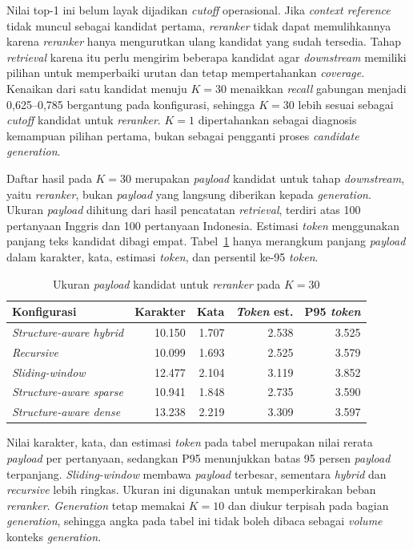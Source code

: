 Nilai top-1 ini belum layak dijadikan \emph{cutoff} operasional. Jika \emph{context reference} tidak muncul
sebagai kandidat pertama, \emph{reranker} tidak dapat memulihkannya karena \emph{reranker} hanya mengurutkan
ulang kandidat yang sudah tersedia. Tahap \emph{retrieval} karena itu perlu mengirim beberapa kandidat
agar \emph{downstream} memiliki pilihan untuk memperbaiki urutan dan tetap mempertahankan \emph{coverage}.
Kenaikan dari satu kandidat menuju \(K = 30\) menaikkan \emph{recall} gabungan menjadi 0,625--0,785
bergantung pada konfigurasi, sehingga \(K = 30\) lebih sesuai sebagai \emph{cutoff} kandidat untuk
\emph{reranker}. \(K = 1\) dipertahankan sebagai diagnosis kemampuan pilihan pertama, bukan sebagai
pengganti proses \emph{candidate} \emph{generation}.

Daftar hasil pada \(K = 30\) merupakan \emph{payload} kandidat untuk tahap \emph{downstream}, yaitu \emph{reranker},
bukan \emph{payload} yang langsung diberikan kepada \emph{generation}. Ukuran \emph{payload} dihitung dari hasil pencatatan
\emph{retrieval}, terdiri atas 100 pertanyaan Inggris dan 100 pertanyaan Indonesia. Estimasi \emph{token}
menggunakan panjang teks kandidat dibagi empat. Tabel~\ref{tab:customer-system-volume} hanya
merangkum panjang \emph{payload} dalam karakter, kata, estimasi \emph{token}, dan persentil ke-95 \emph{token}.

\begin{table}[H]
\centering
\scriptsize
\caption{Ukuran \emph{payload} kandidat untuk \emph{reranker} pada \(K = 30\)}
\label{tab:customer-system-volume}
\begin{tabularx}{\textwidth}{@{}>{\RaggedRight\arraybackslash}p{4.0cm}rrrr@{}}
\toprule
\textbf{Konfigurasi} & \textbf{Karakter} & \textbf{Kata} & \textbf{\emph{Token} est.} & \textbf{P95 \emph{token}}\\
\midrule
\emph{Structure-aware hybrid} & 10.150 & 1.707 & 2.538 & 3.525\\
\emph{Recursive} & 10.099 & 1.693 & 2.525 & 3.579\\
\emph{Sliding-window} & 12.477 & 2.104 & 3.119 & 3.852\\
\emph{Structure-aware sparse} & 10.941 & 1.848 & 2.735 & 3.590\\
\emph{Structure-aware dense} & 13.238 & 2.219 & 3.309 & 3.597\\
\bottomrule
\end{tabularx}
\end{table}

Nilai karakter, kata, dan estimasi \emph{token} pada tabel merupakan nilai rerata \emph{payload} per pertanyaan,
sedangkan P95 menunjukkan batas 95 persen \emph{payload} terpanjang. \emph{Sliding-window} membawa \emph{payload}
terbesar, sementara \emph{hybrid} dan \emph{recursive} lebih ringkas. Ukuran ini digunakan untuk memperkirakan
beban \emph{reranker}. \emph{Generation} tetap memakai \(K = 10\) dan diukur terpisah pada bagian \emph{generation},
sehingga angka pada tabel ini tidak boleh dibaca sebagai \emph{volume} konteks \emph{generation}.

